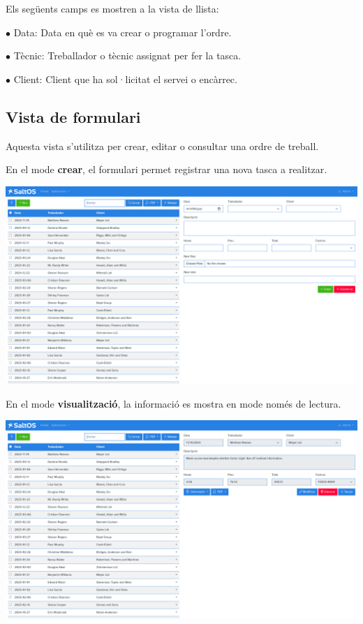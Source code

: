 \documentclass[a4paper]{article}
\begin{document}
Els següents camps es mostren a la vista de llista:

\begin{compactitem}
\item[\color{myblue}$\bullet$] Data: Data en què es va crear o programar l'ordre.
\item[\color{myblue}$\bullet$] Tècnic: Treballador o tècnic assignat per fer la tasca.
\item[\color{myblue}$\bullet$] Client: Client que ha sol·licitat el servei o encàrrec.
\end{compactitem}

\hypertarget{toc174}{}
\subsection{Vista de formulari}

Aquesta vista s'utilitza per crear, editar o consultar una ordre de treball.

En el mode \textbf{crear}, el formulari permet registrar una nova tasca a realitzar.

\begin{center}\includegraphics[width=1\textwidth]{../ujest/snaps/test-screenshots-js-screenshots-sales-workorders-create-ca-es-1-snap.png}\end{center}

En el mode \textbf{visualització}, la informació es mostra en mode només de lectura.

\begin{center}\includegraphics[width=1\textwidth]{../ujest/snaps/test-screenshots-js-screenshots-sales-workorders-view-100-ca-es-1-snap.png}\end{center}
\end{document}
